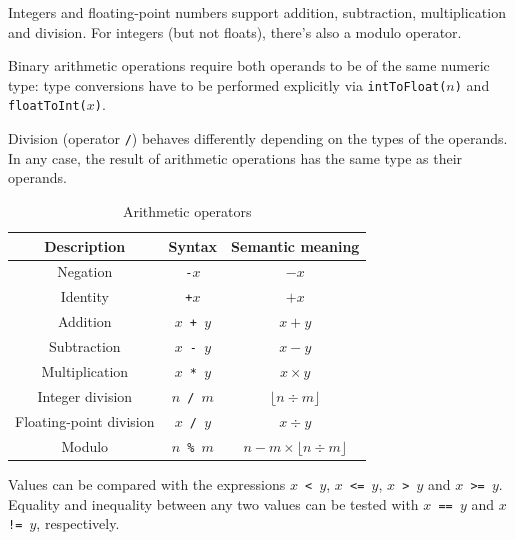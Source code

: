 \documentclass[UdineBachThesis,american,11pt]{PhdThesis}
\begin{document}
  Integers and floating-point numbers support addition, subtraction,
  multiplication and division. For integers (but not floats), there's also a
  modulo operator.

  Binary arithmetic operations require both operands to be of the same numeric
  type: type conversions have to be performed explicitly via
  \mbox{\texttt{intToFloat($n$)}} and \mbox{\texttt{floatToInt($x$)}}.

  Division (operator \texttt{/}) behaves differently depending on the types of
  the operands. In any case, the result of arithmetic operations has the same
  type as their operands.

  \begin{table}[H]
    \centering

    \begin{tabular}{|c|c|c|}
      \hline

      Description &
      Syntax &
      Semantic meaning \\
      \hline

      Negation &
      \texttt{-$x$} &
      $-x$ \\

      Identity &
      \texttt{+$x$} &
      $+x$ \\

      Addition &
      \texttt{$x$ + $y$} &
      $x + y$ \\

      Subtraction &
      \texttt{$x$ - $y$} &
      $x - y$ \\

      Multiplication &
      \texttt{$x$ * $y$} &
      $x \times y$ \\

      Integer division &
      \texttt{$n$ / $m$} &
      $\lfloor n \div m \rfloor$ \\

      Floating-point division &
      \texttt{$x$ / $y$} &
      $x \div y$ \\

      Modulo &
      \texttt{$n$ \% $m$} &
      $n - m \times \lfloor n \div m \rfloor$ \\
      \hline
    \end{tabular}

    \caption{Arithmetic operators}
  \end{table}

  Values can be compared with the expressions \mbox{\texttt{$x$ < $y$}},
  \mbox{\texttt{$x$ <= $y$}}, \mbox{\texttt{$x$ > $y$}} and
  \mbox{\texttt{$x$ >= $y$}}. Equality and inequality between any two values can
  be tested with \mbox{\texttt{$x$ == $y$}} and \mbox{\texttt{$x$ != $y$}},
  respectively.
\end{document}
